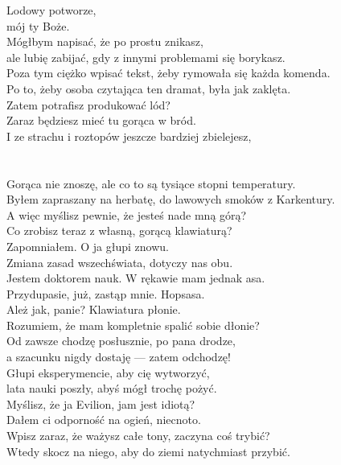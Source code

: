 \chardok{}
Lodowy potworze,\\
mój ty Boże.\\
Mógłbym napisać, że po prostu znikasz, \\
ale lubię zabijać, gdy z innymi problemami się borykasz.\\
Poza tym ciężko wpisać tekst, żeby rymowała się każda komenda.\\
Po to, żeby osoba czytająca ten dramat, była jak zaklęta.\\
Zatem potrafisz produkować lód?\\
Zaraz będziesz mieć tu gorąca w bród.\\
I ze strachu i roztopów jeszcze bardziej zbielejesz,\\
\\

\\

\charmik{}
Gorąca nie znoszę, ale co to są tysiące stopni temperatury.\\
Byłem zapraszany na herbatę, do lawowych smoków z Karkentury.\\
A więc myślisz pewnie, że jesteś nade mną górą?\\
Co zrobisz teraz z własną, gorącą klawiaturą?\\

\chardok{}
Zapomniałem. O ja głupi znowu.\\
Zmiana zasad wszechświata, dotyczy nas obu.\\
Jestem doktorem nauk. W rękawie mam jednak asa.\\
Przydupasie, już, zastąp mnie. Hopsasa.\\

\charprzy{}
Ależ jak, panie? Klawiatura płonie.\\
Rozumiem, że mam kompletnie spalić sobie dłonie?\\
Od zawsze chodzę posłusznie, po pana drodze,\\
a szacunku nigdy dostaję --- zatem odchodzę!\\

\chardok{}
Głupi eksperymencie, aby cię wytworzyć,\\
lata nauki poszły, abyś mógł trochę pożyć.\\
Myślisz, że ja Evilion, jam jest idiotą?\\
Dałem ci odporność na ogień, niecnoto.\\
Wpisz zaraz, że ważysz całe tony, zaczyna coś trybić?\\
Wtedy skocz na niego, aby do ziemi natychmiast przybić.\\

